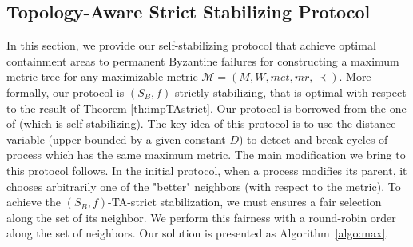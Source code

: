 \documentclass[11pt]{article}
\begin{document}
\subsection{Topology-Aware Strict Stabilizing Protocol}

In this section, we provide our self-stabilizing protocol that achieve optimal containment areas to permanent Byzantine failures for constructing a maximum metric tree for any maximizable metric $\mathcal{M}=(M,W,met,mr,\prec)$. More formally, our protocol is $(S_B,f)$-strictly stabilizing, that is optimal with respect to the result of Theorem \ref{th:impTAstrict}. Our protocol is borrowed from the one of \cite{GS99c} (which is self-stabilizing). The key idea of this protocol is to use the distance variable (upper bounded by a given constant $D$) to detect and break cycles of process which has the same maximum metric. The main modification we bring to this protocol follows. In the initial protocol, when a process modifies its parent, it chooses arbitrarily one of the "better" neighbors (with respect to the metric).  To achieve the $(S_B,f)$-TA-strict stabilization, we must ensures a fair selection along the set of its neighbor. We perform this fairness with a round-robin order along the set of neighbors. Our solution is presented as Algorithm~\ref{algo:max}.
\end{document}
